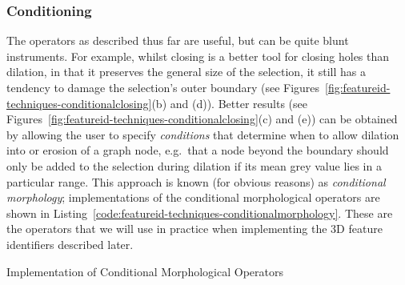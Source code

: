 \subsubsection{Conditioning}

The operators as described thus far are useful, but can be quite blunt instruments. For example, whilst closing is a better tool for closing holes than dilation, in that it preserves the general size of the selection, it still has a tendency to damage the selection's outer boundary (see Figures~\ref{fig:featureid-techniques-conditionalclosing}(b) and (d)). Better results (see Figures~\ref{fig:featureid-techniques-conditionalclosing}(c) and (e)) can be obtained by allowing the user to specify \emph{conditions} that determine when to allow dilation into or erosion of a graph node, e.g.~that a node beyond the boundary should only be added to the selection during dilation if its mean grey value lies in a particular range. This approach is known (for obvious reasons) as \emph{conditional morphology}; implementations of the conditional morphological operators are shown in Listing~\ref{code:featureid-techniques-conditionalmorphology}. These are the operators that we will use in practice when implementing the 3D feature identifiers described later.

\begin{stulisting}[p]
\caption{Implementation of Conditional Morphological Operators}
\label{code:featureid-techniques-conditionalmorphology}

\end{stulisting}

